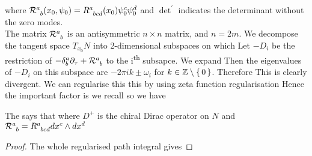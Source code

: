\documentclass{article}
\begin{document}
where $\mc{R}\indices{^a_b}(x_0,\psi_0) = R\indices{^a_b_c_d}(x_0) \psi_0^c \psi_0^d$ and $\det^\prime$ indicates the determinant without the zero modes. \\
The matrix $ \mc{R}\indices{^a_b}$ is an antisymmetric $n\times n$ matrix, and $n=2m$. We decompose the tangent space $T_{x_0} N$ into 2-dimensional subspaces on which 
Let $-D_i$ be the restriction of $-\delta^a_b \del_\tau + \mc{R}\indices{^a_b}$ to the i\textsuperscript{th} subsapce. We expand 
Then the eigenvalues of $-D_i$ on this subspace are $-2\pi i k \pm \omega_i$ for $k\in \mathbb{Z}\setminus\set{0}$. Therefore 
This is clearly divergent. We can regularise this this by using zeta function regularisation 
Hence the important factor is 
we recall 
so we have 
\begin{theorem}
	The  says that 
where $D^+$ is the chiral Dirac operator on $N$ and $\mc{R}\indices{^a_b} = R\indices{^a_b_c_d} dx^c \wedge dx^d$
\end{theorem}
\begin{proof}
The whole regularised path integral gives 
\end{proof}  
 
\end{document}
